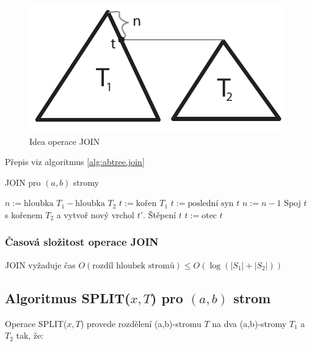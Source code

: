 \begin{figure}
\centering\includegraphics{pics/abtree-join}
\caption{Idea operace JOIN}
\label{fig:abtree.join}
\end{figure}

Přepis viz algoritmus \ref{alg:abtree.join}

\begin{algorithm}[!htb]
\caption{JOIN pro $(a,b)$ stromy}
\label{alg:abtree.join}
\begin{algorithmic}
\STATE $n := \text{hloubka } T_1 - \text{hloubka } T_2$ 
	\STATE $t := \text{kořen } T_1$
		\STATE $t := \text{poslední syn } t$
		\STATE $n := n - 1$
	\ENDWHILE
	\STATE Spoj $t$ s kořenem $T_2$ a vytvoř nový vrchol $t'$.
		\STATE Štěpení $t$		
		\STATE $t := \text{otec } t$
	\ENDWHILE
\ELSE
	\STATE {}
\ENDIF
\end{algorithmic}
\end{algorithm}

\subsubsection{Časová složitost operace JOIN}

JOIN vyžaduje čas $O(\text{rozdíl hloubek stromů}) 
\leq O(\log(|S_1| + |S_2|))$

\subsection{Algoritmus SPLIT($x, T$) pro $(a,b)$ strom}

Operace SPLIT($x, T$) provede rozdělení (a,b)-stromu $T$ na dva
(a,b)-stromy $T_1$ a $T_2$ tak, že:

